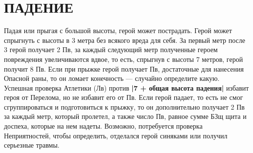 \section{ПАДЕНИЕ}
Падая или прыгая с большой высоты, герой может пострадать. Герой может спрыгнуть с высоты в 3 метра без всякого вреда для себя. За первый метр после 3 герой получает 2 Пв, за каждый следующий метр полученные героем повреждения увеличиваются вдвое, то есть, спрыгнув с высоты 7 метров, герой получит 8 Пв. Если при прыжке герой получает Пв, достаточные для нанесения Опасной раны, то он ломает конечность — случайно определите какую. Успешная проверка Атлетики (Лв) против \textbf{|7 + общая высота падения|} избавит героя от Перелома, но не избавит его от Пв.
\newline
Если герой падает, то есть не смог сгруппироваться и подготовиться к прыжку, то он дополнительно получает 2 Пв за каждый метр, который пролетел, а также число Пв, равное сумме БЗщ щита и доспеха, которые на нем надеты. Возможно, потребуется проверка Неприятностей, чтобы определить, отделался герой синяками или получил серьезные травмы.
